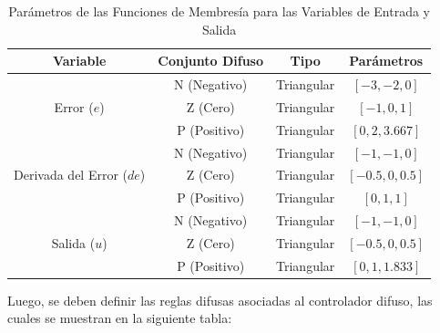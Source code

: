 \begin{enumerate}
    \begin{table}[h]
        \centering
        \caption{Parámetros de las Funciones de Membresía para las Variables de Entrada y Salida}
        \begin{tabular}{|c|c|c|c|}
        \hline
        \textbf{Variable} & \textbf{Conjunto Difuso} & \textbf{Tipo} & \textbf{Parámetros} \\ \hline
        \multirow{3}{*}{Error (\(e\))} & N (Negativo) & Triangular & \([-3, -2, 0]\) \\ \cline{2-4} 
         & Z (Cero) & Triangular & \([-1, 0, 1]\) \\ \cline{2-4} 
         & P (Positivo) & Triangular & \([0, 2, 3.667]\) \\ \hline
        \multirow{3}{*}{Derivada del Error (\(de\))} & N (Negativo) & Triangular & \([-1, -1, 0]\) \\ \cline{2-4} 
         & Z (Cero) & Triangular & \([-0.5, 0, 0.5]\) \\ \cline{2-4} 
         & P (Positivo) & Triangular & \([0, 1, 1]\) \\ \hline
        \multirow{3}{*}{Salida (\(u\))} & N (Negativo) & Triangular & \([-1, -1, 0]\) \\ \cline{2-4} 
         & Z (Cero) & Triangular & \([-0.5, 0, 0.5]\) \\ \cline{2-4} 
         & P (Positivo) & Triangular & \([0, 1, 1.833]\) \\ \hline
        \end{tabular}
    \end{table}
    
    Luego, se deben definir las reglas difusas asociadas al controlador difuso, las cuales se muestran en la siguiente tabla:
    

\end{enumerate}
